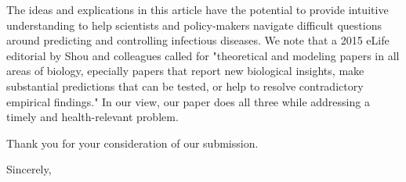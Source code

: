 \documentclass[10pt]{letter}
\begin{document}
\begin{letter}{
}
The ideas and explications in this article have the potential to provide intuitive understanding to help scientists and policy-makers navigate difficult questions around predicting and controlling infectious diseases.  We note that a 2015 eLife editorial by Shou and colleagues \cite{shou2015theory} called for "theoretical and modeling papers in all areas of biology, epecially papers that report new biological insights, make substantial predictions that can be tested, or help to resolve contradictory empirical findings." In our view, our paper does all three while addressing a timely and health-relevant problem.

Thank you for your consideration of our submission.

\closing{Sincerely,}



\end{letter}
\end{document}
